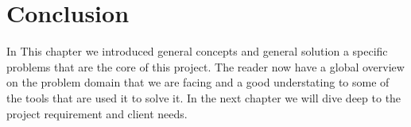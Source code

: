 \section*{Conclusion}
In This chapter we introduced general concepts and general solution a specific
problems that are the core of this project. The reader now have a global
overview on the problem domain that we are facing and a good understating to
some of the tools that are used it to solve it. In the next chapter we will
dive deep to the project requirement and client needs.
